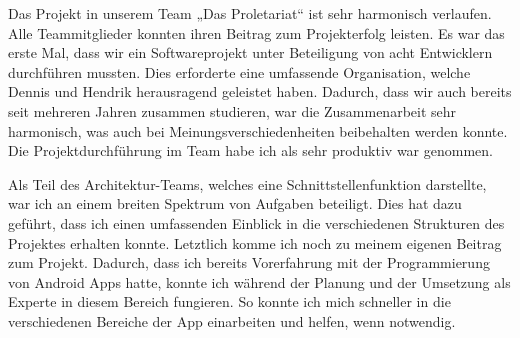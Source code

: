 Das Projekt in unserem Team „Das Proletariat“ ist sehr harmonisch verlaufen. Alle Teammitglieder konnten ihren Beitrag zum Projekterfolg leisten. Es war das erste Mal, dass wir ein Softwareprojekt unter Beteiligung von acht Entwicklern durchführen mussten. Dies erforderte eine umfassende Organisation, welche Dennis und Hendrik herausragend geleistet haben. Dadurch, dass wir auch bereits seit mehreren Jahren zusammen studieren, war die Zusammenarbeit sehr harmonisch, was auch bei Meinungsverschiedenheiten beibehalten werden konnte.  Die Projektdurchführung im Team habe ich als sehr produktiv war genommen.

Als Teil des Architektur-Teams, welches eine Schnittstellenfunktion darstellte, war ich an einem breiten Spektrum von Aufgaben beteiligt. Dies hat dazu geführt, dass ich einen umfassenden Einblick in die verschiedenen Strukturen des Projektes erhalten konnte. 
Letztlich komme ich noch zu meinem eigenen Beitrag zum Projekt. Dadurch, dass ich bereits Vorerfahrung mit der Programmierung von Android Apps hatte, konnte ich während der Planung und der Umsetzung als Experte in diesem Bereich fungieren. So konnte ich mich schneller in die verschiedenen Bereiche der App einarbeiten und helfen, wenn notwendig. 

\clearpage

